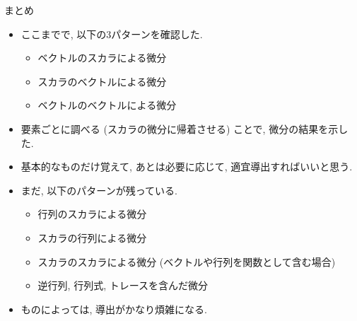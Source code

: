 \documentclass[dvipdfmx,notheorems,t]{beamer}
\begin{document}
\begin{frame}{まとめ}
\begin{itemize}
  \item ここまでで, 以下の3パターンを確認した.
  \begin{itemize}
    \item ベクトルのスカラによる微分
    \item スカラのベクトルによる微分
    \item ベクトルのベクトルによる微分
  \end{itemize}

  \item 要素ごとに調べる (スカラの微分に帰着させる) ことで, 微分の結果を示した.
  \item 基本的なものだけ覚えて, あとは必要に応じて, 適宜導出すればいいと思う.

  \item まだ, 以下のパターンが残っている.
  \begin{itemize}
    \item 行列のスカラによる微分
    \item スカラの行列による微分
    \item スカラのスカラによる微分 (ベクトルや行列を関数として含む場合)
    \item 逆行列, 行列式, トレースを含んだ微分
  \end{itemize}

  \item ものによっては, 導出がかなり煩雑になる.
\end{itemize}
\end{frame}
\end{document}
